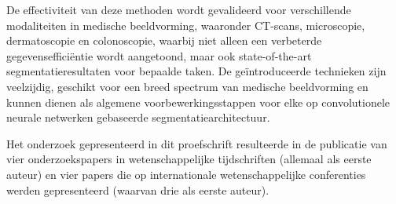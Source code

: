 De effectiviteit van deze methoden wordt gevalideerd voor verschillende modaliteiten in medische beeldvorming, waaronder CT-scans, microscopie, dermatoscopie en colonoscopie, waarbij niet alleen een verbeterde gegevensefficiëntie wordt aangetoond, maar ook state-of-the-art segmentatieresultaten voor bepaalde taken. De geïntroduceerde technieken zijn veelzijdig, geschikt voor een breed spectrum van medische beeldvorming en kunnen dienen als algemene voorbewerkingsstappen voor elke op convolutionele neurale netwerken gebaseerde segmentatiearchitectuur.

Het onderzoek gepresenteerd in dit proefschrift resulteerde in de publicatie van vier onderzoekspapers in wetenschappelijke tijdschriften (allemaal als eerste auteur) en vier papers die op internationale wetenschappelijke conferenties werden gepresenteerd (waarvan drie als eerste auteur). 